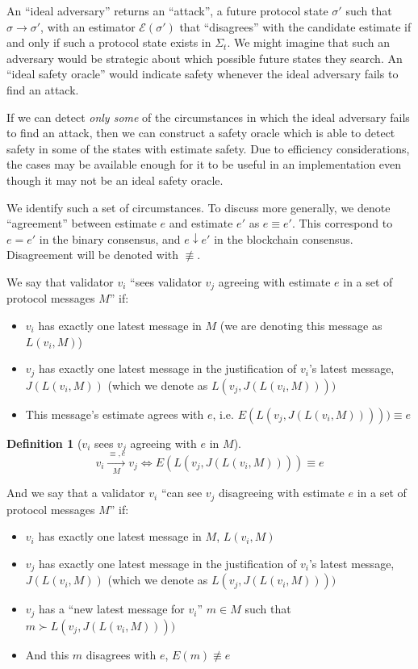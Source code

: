 \documentclass{article}
\theoremstyle{definition}
\newtheorem{defn}{Definition}[section]
\begin{document}
An ``ideal adversary'' returns an ``attack'', a future protocol state $\sigma'$ such that $\sigma \to \sigma'$, with an estimator $\mathcal{E}(\sigma')$ that ``disagrees'' with the candidate estimate if and only if such a protocol state exists in $\Sigma_t$. We might imagine that such an adversary would be strategic about which possible future states they search. An ``ideal safety oracle'' would indicate safety whenever the ideal adversary fails to find an attack.

If we can detect \emph{only some} of the circumstances in which the ideal adversary fails to find an attack, then we can construct a safety oracle which is able to detect safety in some of the states with estimate safety. Due to efficiency considerations, the cases may be available enough for it to be useful in an implementation even though it may not be an ideal safety oracle.

We identify such a set of circumstances. To discuss more generally, we denote ``agreement'' between estimate $e$ and estimate $e'$ as $e \equiv e'$. This correspond to $e = e'$ in the binary consensus, and $e \downarrow e'$ in the blockchain consensus. Disagreement will be denoted with $\not\equiv$.

We say that validator $v_i$ ``sees validator $v_j$ agreeing with estimate $e$ in a set of protocol messages $M$'' if:
\begin{itemize}
\item $v_i$ has exactly one latest message in $M$ (we are denoting this message as $L(v_i, M)$)
\item $v_j$ has exactly one latest message in the justification of $v_i$'s latest message, $J(L(v_i, M))$ (which we denote as $L(v_j, J(L(v_i, M))))$
\item This message's estimate agrees with $e$, i.e. $E(L(v_j, J(L(v_i, M))))) \equiv e$
\end{itemize}

\begin{defn}[$v_i$ sees $v_j$ agreeing with $e$ in $M$]
$$
v_i \xrightarrow[\text{$M$}]{\text{$\equiv, e$}} v_j \iff E(L(v_j, J(L(v_i, M)))) \equiv e
$$
\end{defn}

And we say that a validator $v_i$ ``can see $v_j$ disagreeing with estimate $e$ in a set of protocol messages $M$'' if:
\begin{itemize}
\item $v_i$ has exactly one latest message in $M$, $L(v_i, M)$
\item $v_j$ has exactly one latest message in the justification of $v_i$'s latest message, $J(L(v_i, M))$ (which we denote as $L(v_j, J(L(v_i, M))))$
\item $v_j$ has a ``new latest message for $v_i$'' $m \in M$ such that $m \succ L(v_j, J(L(v_i, M))))$
\item And this $m$ disagrees with $e$, $E(m) \not\equiv e$
\end{itemize}
\end{document}

